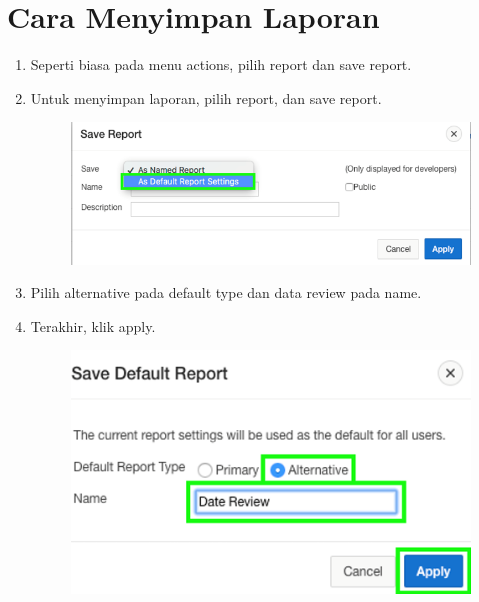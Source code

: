 \section{Cara Menyimpan Laporan}
\begin{enumerate}
    \item{Seperti biasa pada menu actions, pilih report dan save report.}
    \item{Untuk menyimpan laporan, pilih report, dan save report.}
\begin{figure}[!htbp]
    \centering
    \includegraphics[scale=0.5]{section/gambar_bab2/SR.png}
    \label{penanda}
\end{figure}
    \item{Pilih alternative pada default type dan data review pada name.}
    \item{Terakhir, klik apply.}
\begin{figure}[!htbp]
    \centering
    \includegraphics[scale=0.5]{section/gambar_bab2/SDR.png}
    \label{penanda}
\end{figure}
\end{enumerate}

